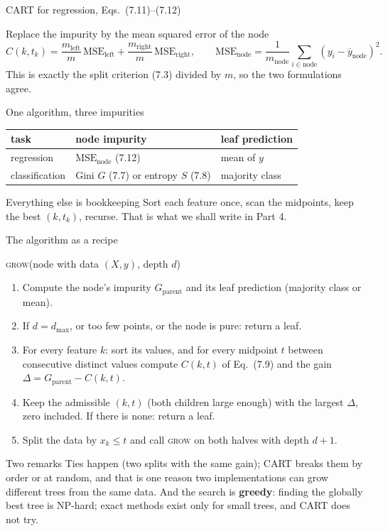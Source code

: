 \documentclass[10pt,aspectratio=169]{beamer}
\begin{document}
\begin{frame}{CART for regression, Eqs.\ (7.11)--(7.12)}
\begin{block}{Replace the impurity by the mean squared error of the node}
\[
  C(k,t_k)=\frac{m_{\mathrm{left}}}{m}\,\mathrm{MSE}_{\mathrm{left}}
          +\frac{m_{\mathrm{right}}}{m}\,\mathrm{MSE}_{\mathrm{right}},
  \qquad
  \mathrm{MSE}_{\mathrm{node}}=\frac{1}{m_{\mathrm{node}}}\sum_{i\in\mathrm{node}}
  \left(y_i-\overline{y}_{\mathrm{node}}\right)^2 .
\]
This is exactly the split criterion (7.3) divided by $m$, so the two
formulations agree.
\end{block}
\begin{block}{One algorithm, three impurities}
\centering
\begin{tabular}{lll}\toprule
task & node impurity & leaf prediction\\\midrule
regression & $\mathrm{MSE}_{\mathrm{node}}$ (7.12) & mean of $y$\\
classification & Gini $G$ (7.7) or entropy $S$ (7.8) & majority class\\\bottomrule
\end{tabular}
\end{block}
\begin{block}{Everything else is bookkeeping}
Sort each feature once, scan the midpoints, keep the best $(k,t_k)$, recurse.
That is what we shall write in Part 4.
\end{block}
\end{frame}

\begin{frame}{The algorithm as a recipe}
\small
\begin{block}{\textsc{grow}(node with data $(X,y)$, depth $d$)}
\begin{enumerate}
  \item Compute the node's impurity $G_{\mathrm{parent}}$ and its leaf
        prediction (majority class or mean).
  \item If $d=d_{\max}$, or too few points, or the node is pure: return a leaf.
  \item For every feature $k$: sort its values, and for every midpoint $t$
        between consecutive distinct values compute $C(k,t)$ of Eq.\ (7.9)
        and the gain $\Delta=G_{\mathrm{parent}}-C(k,t)$.
  \item Keep the admissible $(k,t)$ (both children large enough) with the
        largest $\Delta$, zero included.  If there is none: return a leaf.
  \item Split the data by $x_k\le t$ and call \textsc{grow} on both halves
        with depth $d+1$.
\end{enumerate}
\end{block}
\begin{block}{Two remarks}
Ties happen (two splits with the same gain); CART breaks them by order or at
random, and that is one reason two implementations can grow different trees
from the same data.  And the search is \textbf{greedy}: finding the globally
best tree is NP-hard; exact methods exist only for small trees, and CART
does not try.
\end{block}
\end{frame}
\end{document}
